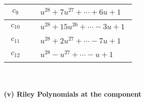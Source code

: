 \documentclass[1p]{elsarticle_modified}
\theoremstyle{definition}
\begin{document}
\begin{tabular}{m{50pt}|m{274pt}}
\hline $$\begin{aligned}c_{9}\end{aligned}$$&$\begin{aligned}
&u^{28}+7 u^{27}+\cdots+6 u+1
\end{aligned}$\\
\hline $$\begin{aligned}c_{10}\end{aligned}$$&$\begin{aligned}
&u^{28}+15 u^{26}+\cdots-3 u+1
\end{aligned}$\\
\hline $$\begin{aligned}c_{11}\end{aligned}$$&$\begin{aligned}
&u^{28}+2 u^{27}+\cdots-7 u+1
\end{aligned}$\\
\hline $$\begin{aligned}c_{12}\end{aligned}$$&$\begin{aligned}
&u^{28}- u^{27}+\cdots- u+1
\end{aligned}$\\
\hline
\end{tabular}\\~\\
\newpage\renewcommand{\arraystretch}{1}
\flushleft \textbf{(v) Riley Polynomials at the component}\newline \\
\end{document}
